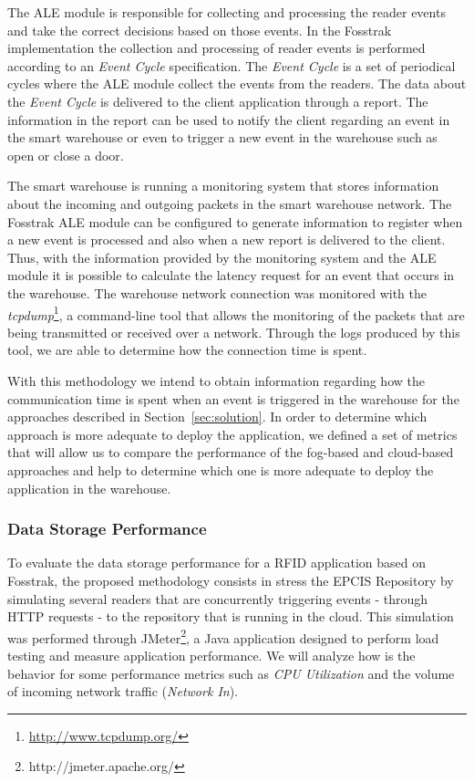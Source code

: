 The \gls{ALE} module is responsible for collecting and processing the reader events and take the
correct decisions based on those events. In the Fosstrak implementation the collection and processing
of reader events is performed according to an \textit{Event Cycle} specification. The \textit{Event Cycle}
is a set of periodical cycles where the \gls{ALE} module collect the events from the readers. The data
about the \textit{Event Cycle} is delivered to the client application through a report. The information
in the report can be used to notify the client regarding an event in the smart warehouse or even to
trigger a new event in the warehouse such as open or close a door.

The smart warehouse is running a monitoring system that stores information about the incoming and outgoing
packets in the smart warehouse network. The Fosstrak \gls{ALE} module can be configured to generate
information to register when a new event is processed and also when a new report is delivered to the
client. Thus, with the information provided by the monitoring system and the \gls{ALE} module it is
possible to calculate the latency request for an event that occurs in the warehouse. The warehouse network
connection was monitored with the \textit{tcpdump}\footnote{\url{http://www.tcpdump.org/}}, a command-line
tool that allows the monitoring of the packets that are being transmitted or received over a network.
Through the logs produced by this tool, we are able to determine how the connection time is spent.

With this methodology we intend to obtain information regarding how the communication time is spent
when an event is triggered in the warehouse for the approaches described in Section~\ref{sec:solution}.
In order to determine which approach is more adequate to deploy the application, we defined a set of
metrics that will allow us to compare the performance of the fog-based and cloud-based approaches and
help to determine which one is more adequate to deploy the application in the warehouse.

\subsubsection{Data Storage Performance}
To evaluate the data storage performance for a RFID application based on Fosstrak, the proposed
methodology consists in stress the EPCIS Repository by simulating several readers that are concurrently
triggering events - through HTTP requests - to the repository that is running in the cloud. This
simulation was performed through JMeter\footnote{http://jmeter.apache.org/}, a Java application
designed to perform load testing and measure application performance. We will analyze how is the
behavior for some performance metrics such as \textit{CPU Utilization} and the volume of incoming
network traffic (\textit{Network In}).

